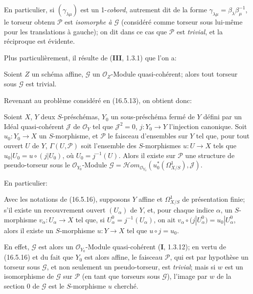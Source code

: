 \begin{env}[16.5.15]
En particulier, si $(\gamma_{\lambda\mu})$ est un 1-\emph{cobord}, autrement
dit de la forme
$\gamma_{\lambda\mu}=\beta_\lambda\beta_\mu^{-1}$, le torseur obtenu
$\mathscr{P}$ est \emph{isomorphe à $\mathscr{G}$} (considéré comme torseur
sous lui-même pour les translations à gauche); on dit dans ce cas que
$\mathscr{P}$ est \emph{trivial}, et la réciproque est évidente.

Plus particulièrement, il résulte de (\textbf{III}, 1.3.1) que l'on a:
\end{env}

\begin{proposition}[16.5.16]
\label{IV.16.5.16}
Soient $Z$ un schéma affine, $\mathscr{G}$ un $\mathcal{O}_Z$-Module
quasi-cohérent; alors tout torseur sous $\mathscr{G}$ est trivial.
\end{proposition}

Revenant au problème considéré en (16.5.13), on obtient donc:

\begin{proposition}[16.5.17]
\label{IV.16.5.17}
Soient $X$, $Y$ deux $S$-préschémas, $Y_0$ un sous-préschéma fermé de $Y$
défini par un Idéal quasi-cohérent $\mathscr{J}$ de $\mathcal{O}_Y$ tel que
$\mathscr{J}^2=0$, $j:Y_0\to Y$ l'injection canonique. Soit
$u_0:Y_0\to X$ un $S$-morphisme, et $\mathscr{P}$ le faisceau d'ensembles sur
$Y$ tel que, pour tout ouvert $U$ de $Y$, $\Gamma(U,\mathscr{P})$ soit
l'ensemble des $S$-morphismes $u:U\to X$ tels que
$u_0|U_0=u\circ(j|U_0)$, où $U_0=j^{-1}(U)$. Alors il existe sur
$\mathscr{P}$ une structure de pseudo-torseur sous le
$\mathcal{O}_{Y_0}$-Module
$\mathscr{G}=\mathscr{H}om_{\mathcal{O}_{Y_0}}(u_0^*(\varOmega_{X/S}^1),\mathscr{J})$.
\end{proposition}

En particulier:

\begin{corollary}[16.5.18]
\label{IV.16.5.18}
Avec les notations de \textup{(16.5.16)}, supposons $Y$ affine et $\varOmega_{X/S}^1$ de
présentation finie; s'il existe un recouvrement ouvert $(U_\alpha)$ de $Y$,
et, pour chaque indice $\alpha$, un $S$-morphisme $v_\alpha:U_\alpha\to X$
tel que, si $U_\alpha^0=j^{-1}(U_\alpha)$, on ait
$v_\alpha\circ(j|U_\alpha^0)=u_0|U_\alpha^0$, alors il existe un
$S$-morphisme $u:Y\to X$ tel que $u\circ j=u_0$.
\end{corollary}

En effet, $\mathscr{G}$ est alors un $\mathcal{O}_{Y_0}$-Module
quasi-cohérent (\textbf{I}, 1.3.12); en vertu de (16.5.16) et du fait que $Y_0$ est
alors affine, le faisceau $\mathscr{P}$, qui est par hypothèse un torseur sous
$\mathscr{G}$, et non seulement un pseudo-torseur, est \emph{trivial}; mais si
$w$ est un isomorphisme de $\mathscr{G}$ sur $\mathscr{P}$ (en tant que
torseurs sous $\mathscr{G}$), l'image par $w$ de la section 0 de
$\mathscr{G}$ est le $S$-morphisme $u$ cherché.

